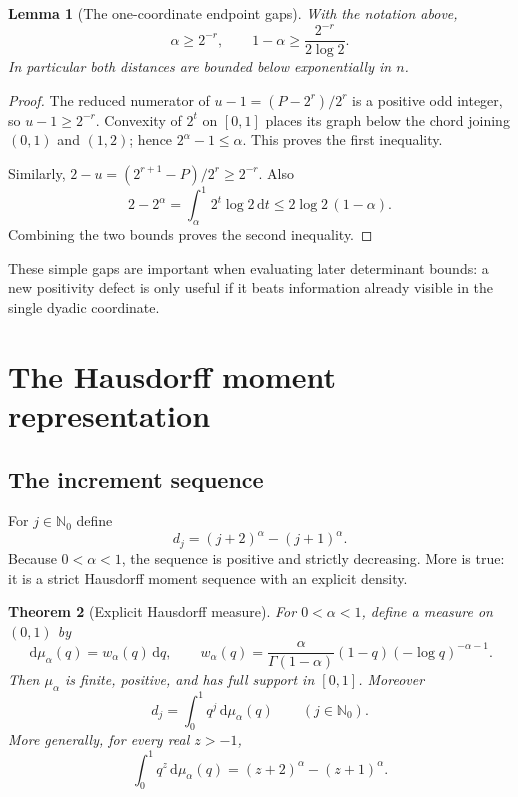 \documentclass[11pt,oneside]{article}
\newtheorem{theorem}{Theorem}[section]
\newtheorem{lemma}[theorem]{Lemma}
\theoremstyle{definition}
\theoremstyle{remark}
\newcommand{\Nzero}{\mathbb N_0}
\newcommand{\dd}{\,\mathrm d}
\begin{document}
\begin{lemma}[The one-coordinate endpoint gaps]\label{lem:trivial-gaps}
With the notation above,
\begin{equation}\label{eq:trivial-gaps}
 \alpha\ge2^{-r},
 \qquad
 1-\alpha\ge\frac{2^{-r}}{2\log2}.
\end{equation}
In particular both distances are bounded below exponentially in $n$.
\end{lemma}

\begin{proof}
The reduced numerator of $u-1=(P-2^r)/2^r$ is a positive odd integer, so
$u-1\ge2^{-r}$.  Convexity of $2^t$ on $[0,1]$ places its graph below the chord joining
$(0,1)$ and $(1,2)$; hence $2^\alpha-1\le\alpha$.  This proves the first inequality.

Similarly, $2-u=(2^{r+1}-P)/2^r\ge2^{-r}$.  Also
\[
 2-2^\alpha=\int_\alpha^1 2^t\log2\dd t
 \le2\log2\,(1-\alpha).
\]
Combining the two bounds proves the second inequality.
\end{proof}

These simple gaps are important when evaluating later determinant bounds: a new positivity
defect is only useful if it beats information already visible in the single dyadic coordinate.

\section{The Hausdorff moment representation}

\subsection{The increment sequence}

For $j\in\Nzero$ define
\begin{equation}\label{eq:dj-def}
 d_j=(j+2)^\alpha-(j+1)^\alpha.
\end{equation}
Because $0<\alpha<1$, the sequence is positive and strictly decreasing.  More is true: it is a
strict Hausdorff moment sequence with an explicit density.

\begin{theorem}[Explicit Hausdorff measure]\label{thm:hausdorff}
For $0<\alpha<1$, define a measure on $(0,1)$ by
\begin{equation}\label{eq:mu-density}
 \dd\mu_\alpha(q)=w_\alpha(q)\dd q,
 \qquad
 w_\alpha(q)=\frac{\alpha}{\Gamma(1-\alpha)}
 (1-q)(-\log q)^{-\alpha-1}.
\end{equation}
Then $\mu_\alpha$ is finite, positive, and has full support in $[0,1]$.  Moreover
\begin{equation}\label{eq:moment-representation}
 d_j=\int_0^1q^j\dd\mu_\alpha(q)
 \qquad(j\in\Nzero).
\end{equation}
More generally, for every real $z>-1$,
\begin{equation}\label{eq:mellin-extension}
 \int_0^1q^z\dd\mu_\alpha(q)
 =(z+2)^\alpha-(z+1)^\alpha.
\end{equation}
\end{theorem}
\end{document}
